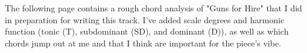 


The following page contains a rough chord analysis of "Guns for Hire" that I did in preparation for writing this track. I've added scale degrees and harmonic function (tonic (T), subdominant (SD), and dominant (D)), as well as which chords jump out at me and that I think are important for the piece's vibe.




